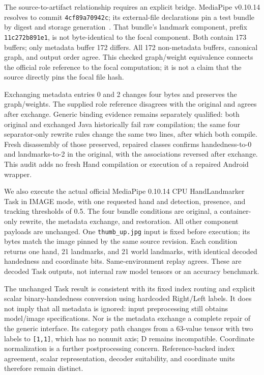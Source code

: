 \documentclass[10pt,twocolumn,letterpaper]{article}
\newcommand{\code}[1]{\texttt{#1}}
\begin{document}
The source-to-artifact relationship requires an explicit bridge. MediaPipe v0.10.14 resolves to commit \code{4cf89a70942c}; its external-file declarations pin a test bundle by digest and storage generation~\cite{hand-assets}. That bundle's landmark component, prefix \code{11c272b891e1}, is not byte-identical to the focal component. Both contain 173 buffers; only metadata buffer 172 differs. All 172 non-metadata buffers, canonical graph, and output order agree. This checked graph/weight equivalence connects the official role reference to the focal computation; it is not a claim that the source directly pins the focal file hash.

Exchanging metadata entries 0 and 2 changes four bytes and preserves the graph/weights. The supplied role reference disagrees with the original and agrees after exchange. Generic binding evidence remains separately qualified: both original and exchanged Java historically fail raw compilation; the same four separator-only rewrite rules change the same two lines, after which both compile. Fresh disassembly of those preserved, repaired classes confirms handedness-to-0 and landmarks-to-2 in the original, with the associations reversed after exchange. This audit adds no fresh Hand compilation or execution of a repaired Android wrapper.

We also execute the actual official MediaPipe 0.10.14 CPU HandLandmarker Task in IMAGE mode, with one requested hand and detection, presence, and tracking thresholds of 0.5. The four bundle conditions are original, a container-only rewrite, the metadata exchange, and restoration. All other component payloads are unchanged. One \code{thumb\_up.jpg} input is fixed before execution; its bytes match the image pinned by the same source revision. Each condition returns one hand, 21 landmarks, and 21 world landmarks, with identical decoded handedness and coordinate bits. Same-environment replay agrees. These are decoded Task outputs, not internal raw model tensors or an accuracy benchmark.

The unchanged Task result is consistent with its fixed index routing and explicit scalar binary-handedness conversion using hardcoded Right/Left labels. It does not imply that all metadata is ignored: input preprocessing still obtains model/image specifications. Nor is the metadata exchange a complete repair of the generic interface. Its category path changes from a 63-value tensor with two labels to \code{[1,1]}, which has no nonunit axis; D remains incompatible. Coordinate normalization is a further postprocessing concern. Reference-backed index agreement, scalar representation, decoder suitability, and coordinate units therefore remain distinct.
\end{document}
